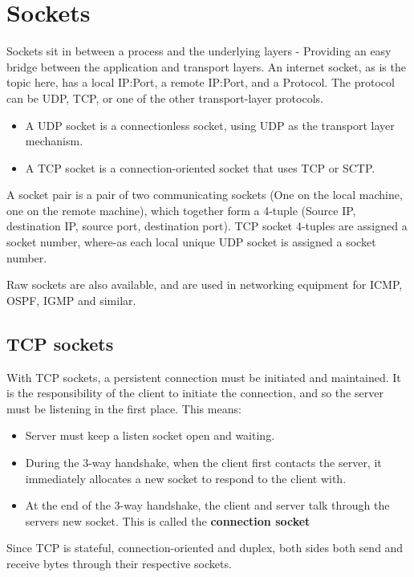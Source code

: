 \section{Sockets}
Sockets sit in between a process and the underlying layers - Providing an easy
bridge between the application and transport layers. An internet socket, as is
the topic here, has a local IP:Port, a remote IP:Port, and a Protocol. The protocol
can be UDP, TCP, or one of the other transport-layer protocols.

\begin{itemize}
    \item A UDP socket is a connectionless socket, using UDP as the transport layer mechanism.
    \item A TCP socket is a connection-oriented socket that uses TCP or SCTP.
\end{itemize}

A socket pair is a pair of two communicating sockets (One on the local machine,
one on the remote machine), which together form a 4-tuple (Source IP, destination IP,
source port, destination port). TCP socket 4-tuples are assigned a socket number,
where-as each local unique UDP socket is assigned a socket number.

Raw sockets are also available, and are used in networking equipment for ICMP,
OSPF, IGMP and similar.

\subsection{TCP sockets}
With TCP sockets, a persistent connection must be initiated and maintained. It
is the responsibility of the client to initiate the connection, and so the server
must be listening in the first place. This means:

\begin{itemize}
    \item Server must keep a listen socket open and waiting.
    \item During the 3-way handshake, when the client first contacts the server,
        it immediately allocates a new socket to respond to the client with.
    \item At the end of the 3-way handshake, the client and server talk through
        the servers new socket. This is called the \textbf{connection socket}
\end{itemize}

Since TCP is stateful, connection-oriented and duplex, both sides both send
and receive bytes through their respective sockets. 


